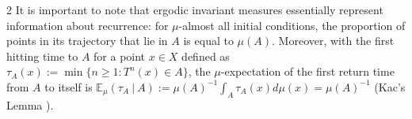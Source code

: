 \documentclass[11pt]{article}
\begin{document}
\begin{multicols}{2}
It is important to note that ergodic invariant measures essentially represent information about recurrence: for $\mu$-almost all initial conditions, the proportion of points in its trajectory that lie in $A$ is equal to $\mu(A)$.
Moreover, with the first hitting time to $A$ for a point $x\in X$ defined as $\tau_A(x) := \min \{ n \ge 1 : T^n(x) \in A \}$, the $\mu$-expectation of the first return time from $A$ to itself is $\mathbb{E}_\mu(\tau_A~|~A):=
\mu(A)^{-1}\int_A \tau_A(x)d\mu(x)=\mu(A)^{-1}$ (Kac's Lemma  
\cite{kac1947notion}).




\end{multicols}
\end{document}
